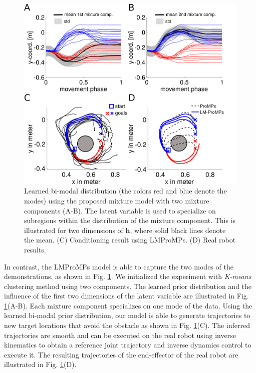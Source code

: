  
 
 
\begin{figure}
\begin{center}
\includegraphics[width=0.48\columnwidth]{elmarICRA/pics/BiModal_Mixture.png}
\end{center}
\caption{Learned bi-modal distribution (the colors red and blue denote the modes) using the proposed mixture model with two mixture components (A-B). 
The latent variable is used to specialize on subregions within the distribution of the mixture component. 
This is illustrated for two dimensions of $\textbf{h}$, where solid black lines denote the mean. 
(C) Conditioning result using LMProMPs. (D) Real robot results.
\label{fig:bimodal_mixture}}
\end{figure}
  
In contrast, the LMProMPs model is able to capture the two modes of the
demonstrations, as shown in Fig. \ref{fig:bimodal_mixture}. We initialized the
experiment with \textit{K-means} clustering method using two components.  The
learned prior distribution and the influence of the first two dimensions of the
latent variable are illustrated in Fig. \ref{fig:bimodal_mixture}(A-B).
Each mixture component specializes on one mode of the data.  Using the learned
bi-modal prior distribution, our model is able to generate trajectories to new 
target locations that avoid the obstacle as shown in Fig.
\ref{fig:bimodal_mixture}(C).  
The inferred trajectories are smooth and can be
executed on the real robot using inverse kinematics to obtain a reference joint
trajectory and inverse dynamics control to execute it.  The resulting
trajectories of the end-effector of the real robot are illustrated in Fig.
\ref{fig:bimodal_mixture}(D). 


